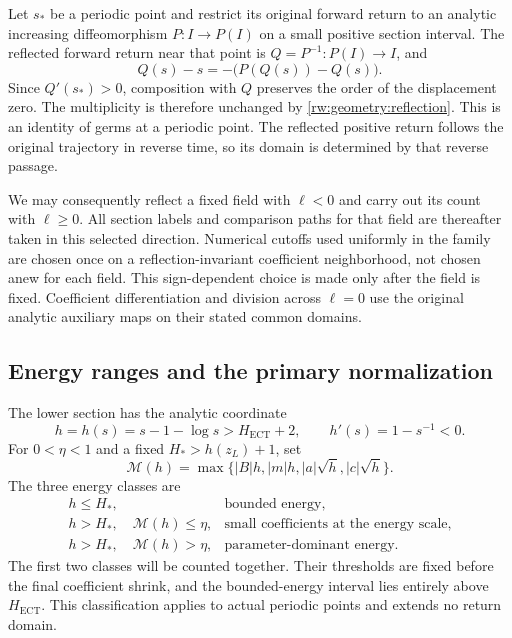 Let $s_*$ be a periodic point and restrict its original
forward return to an analytic increasing diffeomorphism
$P:I\to P(I)$ on a small positive section interval.  The reflected
forward return near that point is $Q=P^{-1}:P(I)\to I$, and
\begin{equation}\label{rw:geometry:inverse-germ}
 Q(s)-s=-\bigl(P(Q(s))-Q(s)\bigr).
\end{equation}
Since $Q'(s_*)>0$, composition with $Q$ preserves the order of the
displacement zero.  The multiplicity is therefore unchanged by
\eqref{rw:geometry:reflection}.  This is an identity of germs at a
periodic point.  The reflected positive return follows the original
trajectory in reverse time, so its domain is determined by that reverse
passage.

We may consequently reflect a fixed field with $\ell<0$ and carry out
its count with $\ell\ge0$.  All section labels and comparison paths
for that field are thereafter taken in this selected direction.
Numerical cutoffs used uniformly in the family are chosen once on a
reflection-invariant coefficient neighborhood, not chosen anew for
each field.  This sign-dependent choice is made only after the field
is fixed.  Coefficient differentiation and division across $\ell=0$
use the original analytic auxiliary maps on their stated common domains.

\subsection{Energy ranges and the primary normalization}

The lower section has the analytic coordinate
\[
 h=h(s)=s-1-\log s>H_{\mathrm{ECT}}+2,
 \qquad h'(s)=1-s^{-1}<0.
\]
For $0<\eta<1$ and a fixed $H_*>h(z_L)+1$, set
\[
 \mathscr M(h)=\max\{|B|h,|m|h,|a|\sqrt h,|c|\sqrt h\}.
\]
The three energy classes are
\begin{equation}\label{rw:geometry:energy-classes}
 \begin{array}{ll}
 h\le H_*,&\text{bounded energy},\\
 h>H_*,\quad\mathscr M(h)\le\eta,
       &\text{small coefficients at the energy scale},\\
 h>H_*,\quad\mathscr M(h)>\eta,
       &\text{parameter-dominant energy}.
 \end{array}
\end{equation}
The first two classes will be counted together.  Their thresholds are
fixed before the final coefficient shrink, and the bounded-energy
interval lies entirely above $H_{\mathrm{ECT}}$.
This classification applies to actual periodic
points and extends no return domain.

